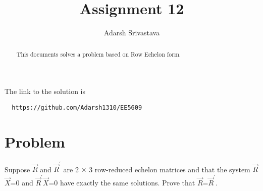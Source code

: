\documentclass[journal,12pt,twocolumn]{IEEEtran}
\begin{document}
      \def\rightbox#1{\makebox[0in][r]{#1}}
      \def\centbox#1{\makebox[0in]{#1}}
      \def\topbox#1{\raisebox{-\baselineskip}[0in][0in]{#1}}
      \def\midbox#1{\raisebox{-0.5\baselineskip}[0in][0in]{#1}}
 \vspace{3cm}
 \title{Assignment 12}
 \author{Adarsh Srivastava}
 \maketitle
 \newpage
 \bigskip
 \renewcommand{\thetable}{\theenumi}
 The link to the solution is
 \begin{lstlisting}
  https://github.com/Adarsh1310/EE5609
 \end{lstlisting}
 \begin{abstract}
 This documents solves a problem based on Row Echelon form.
 \end{abstract}
  \section{\textbf{Problem}}
Suppose $\vec{R}$ and $\vec{R}^{'}$ are 2 $\times$ 3 row-reduced echelon matrices and that the system $\vec{R}$$\vec{X}$=0 and $\vec{R}^{'}$$\vec{X}$=0 have exactly the same solutions. Prove that $\vec{R}$=$\vec{R}^'$.
\end{document}
